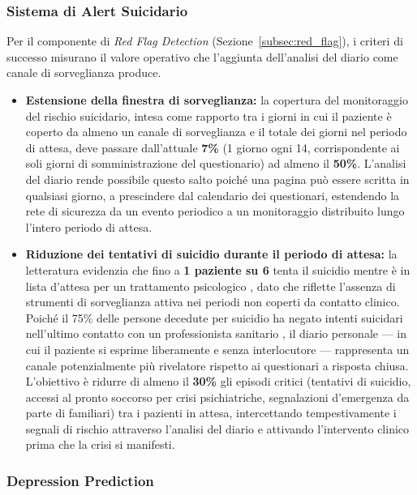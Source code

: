 \subsubsection{Sistema di Alert Suicidario}
\label{subsubsec:kpi_alert}

Per il componente di \textit{Red Flag Detection} (Sezione~\ref{subsec:red_flag}), i criteri di successo misurano il valore operativo che l'aggiunta dell'analisi del diario come canale di sorveglianza produce.

\begin{itemize}
    \item \textbf{Estensione della finestra di sorveglianza:} la copertura del monitoraggio del rischio suicidario, intesa come rapporto tra i giorni in cui il paziente è coperto da almeno un canale di sorveglianza e il totale dei giorni nel periodo di attesa, deve passare dall'attuale \textbf{7\%} (1 giorno ogni 14, corrispondente ai soli giorni di somministrazione del questionario) ad almeno il \textbf{50\%}. L'analisi del diario rende possibile questo salto poiché una pagina può essere scritta in qualsiasi giorno, a prescindere dal calendario dei questionari, estendendo la rete di sicurezza da un evento periodico a un monitoraggio distribuito lungo l'intero periodo di attesa.

    \item \textbf{Riduzione dei tentativi di suicidio durante il periodo di attesa:} la letteratura evidenzia che fino a \textbf{1 paziente su 6} tenta il suicidio mentre è in lista d'attesa per un trattamento psicologico \cite{we_need_to_talk2014}, dato che riflette l'assenza di strumenti di sorveglianza attiva nei periodi non coperti da contatto clinico. Poiché il 75\% delle persone decedute per suicidio ha negato intenti suicidari nell'ultimo contatto con un professionista sanitario \cite{busch2003clinical}, il diario personale --- in cui il paziente si esprime liberamente e senza interlocutore --- rappresenta un canale potenzialmente più rivelatore rispetto ai questionari a risposta chiusa. L'obiettivo è ridurre di almeno il \textbf{30\%} gli episodi critici (tentativi di suicidio, accessi al pronto soccorso per crisi psichiatriche, segnalazioni d'emergenza da parte di familiari) tra i pazienti in attesa, intercettando tempestivamente i segnali di rischio attraverso l'analisi del diario e attivando l'intervento clinico prima che la crisi si manifesti.
\end{itemize}

\subsubsection{Depression Prediction}
\label{subsubsec:kpi_phq9}

